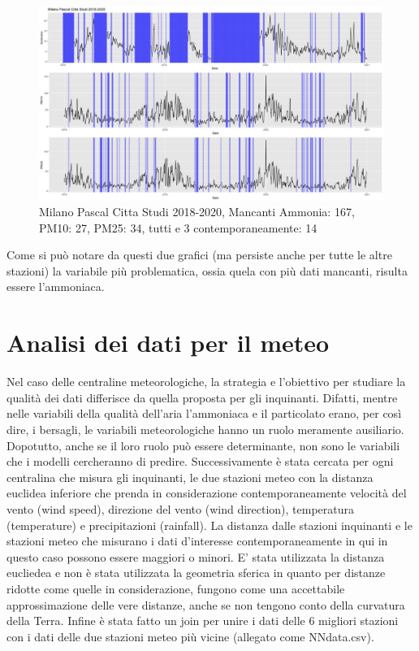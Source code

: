 \documentclass{article}
\begin{document}
\begin{figure}[H]
    \includegraphics[scale=0.35]{Picture/Milano Pascal Citta Studi 2018-2020 .jpeg}
    \caption{Milano Pascal Citta Studi 2018-2020, Mancanti Ammonia: 167, PM10: 27, PM25: 34, tutti e 3 contemporaneamente: 14}
\end{figure}


Come si può notare da questi due grafici (ma persiste anche per tutte le altre stazioni) la variabile
più problematica, ossia quela con più dati mancanti, risulta essere l'ammoniaca.



\section{Analisi dei dati per il meteo}
Nel caso delle centraline meteorologiche, la strategia e l’obiettivo per studiare la qualità dei dati differisce da quella proposta 
per gli inquinanti. 
Difatti, mentre nelle variabili della qualità dell’aria l’ammoniaca e il particolato erano, 
per così dire, i bersagli, le variabili meteorologiche hanno un ruolo meramente ausiliario. 
Dopotutto, anche se il loro ruolo può essere determinante, non sono le variabili che i modelli cercheranno di predire. 
Successivamente è stata cercata per ogni centralina che misura gli inquinanti, le due  
stazioni meteo con la distanza euclidea inferiore che prenda in considerazione contemporaneamente velocità del vento 
(wind speed), direzione del vento (wind direction), temperatura (temperature) e precipitazioni (rainfall).
La distanza dalle stazioni inquinanti e le stazioni meteo che misurano i dati d'interesse contemporaneamente in qui in questo caso possono 
essere maggiori o minori. 
E' stata utilizzata la distanza eucliedea e non è stata utilizzata la geometria sferica in quanto per distanze ridotte come quelle in considerazione, 
fungono come una accettabile approssimazione delle vere distanze, anche se non tengono conto della curvatura della Terra.
Infine è stata fatto un join per unire i dati delle 6 migliori stazioni con i dati delle due
stazioni meteo più vicine (allegato come NNdata.csv). 
\end{document}
